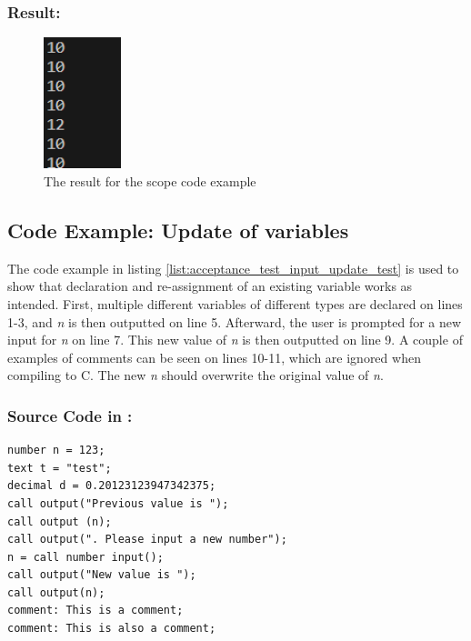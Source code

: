\subsubsection{Result:}
\begin{figure}[H] 
    \begin{center}
        \includegraphics[width=0.20\textwidth]{Files/Billeder: Appendix/Scopetest.png}
    \end{center}
    \caption{The result for the scope code example}
    \label{figure:scope_result}
\end{figure}

\newpage
\subsection{Code Example: Update of variables} \label{test_UpdateVar}

The code example in listing \ref{list:acceptance_test_input_update_test} is used to show that declaration and re-assignment of an existing variable works as intended. First, multiple different variables of different types are declared on lines 1-3, and \textit{n} is then outputted on line 5. Afterward, the user is prompted for a new input for \textit{n} on line 7. This new value of \textit{n} is then outputted on line 9. A couple of examples of comments can be seen on lines 10-11, which are ignored when compiling to C. The new \textit{n} should overwrite the original value of \textit{n}.

\subsubsection{Source Code in \lang:} \label{}
\begin{lstlisting}[language = scriptkid, firstnumber=1, label={list:acceptance_test_input_update_test}, caption=Acceptance test update of variables with input code examples]
number n = 123;
text t = "test";  
decimal d = 0.20123123947342375;  
call output("Previous value is "); 
call output (n); 
call output(". Please input a new number");
n = call number input();  
call output("New value is "); 
call output(n);  
comment: This is a comment;
comment: This is also a comment;  
\end{lstlisting}

